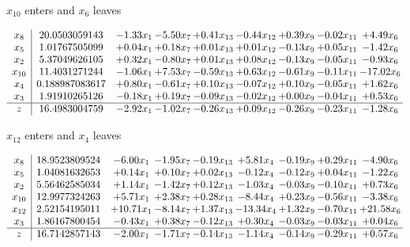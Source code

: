 \documentclass[9pt]{article}
\begin{document}
 $ x_{10} $ enters and $ x_{6} $ leaves 

 \[\begin{array}{c| c c@{\hskip 2pt} c@{\hskip 2pt} c@{\hskip 2pt} c@{\hskip 2pt} c@{\hskip 2pt} c@{\hskip 2pt} c@{\hskip 2pt} }
 x_{8}   &  20.0503059143 & -1.33 x_{1} & -5.50 x_{7} & +  0.41 x_{13} & -0.44 x_{12} & +  0.39 x_{9} & -0.02 x_{11} & +  4.49 x_{6}\\
 x_{5}   &  1.01767505099 & +  0.04 x_{1} & +  0.18 x_{7} & +  0.01 x_{13} & +  0.01 x_{12} & -0.13 x_{9} & +  0.05 x_{11} & -1.42 x_{6}\\
 x_{2}   &  5.37049626105 & +  0.32 x_{1} & -0.80 x_{7} & +  0.01 x_{13} & +  0.08 x_{12} & -0.13 x_{9} & -0.05 x_{11} & -0.93 x_{6}\\
 x_{10}   &  11.4031271244 & -1.06 x_{1} & +  7.53 x_{7} & -0.59 x_{13} & +  0.63 x_{12} & -0.61 x_{9} & -0.11 x_{11} & -17.02 x_{6}\\
 x_{4}   &  0.188987083617 & +  0.80 x_{1} & -0.61 x_{7} & +  0.10 x_{13} & -0.07 x_{12} & +  0.10 x_{9} & -0.05 x_{11} & +  1.62 x_{6}\\
 x_{3}   &  1.91910265126 & -0.18 x_{1} & +  0.19 x_{7} & -0.09 x_{13} & -0.02 x_{12} & +  0.00 x_{9} & -0.04 x_{11} & +  0.53 x_{6}\\
\hline
z    &  16.4983004759 & -2.92 x_{1} & -1.02 x_{7} & -0.26 x_{13} & +  0.09 x_{12} & -0.26 x_{9} & -0.23 x_{11} & -1.28 x_{6}\\
\end{array}\]


 $ x_{12} $ enters and $ x_{4} $ leaves 

 \[\begin{array}{c| c c@{\hskip 2pt} c@{\hskip 2pt} c@{\hskip 2pt} c@{\hskip 2pt} c@{\hskip 2pt} c@{\hskip 2pt} c@{\hskip 2pt} }
 x_{8}   &  18.9523809524 & -6.00 x_{1} & -1.95 x_{7} & -0.19 x_{13} & +  5.81 x_{4} & -0.19 x_{9} & +  0.29 x_{11} & -4.90 x_{6}\\
 x_{5}   &  1.04081632653 & +  0.14 x_{1} & +  0.10 x_{7} & +  0.02 x_{13} & -0.12 x_{4} & -0.12 x_{9} & +  0.04 x_{11} & -1.22 x_{6}\\
 x_{2}   &  5.56462585034 & +  1.14 x_{1} & -1.42 x_{7} & +  0.12 x_{13} & -1.03 x_{4} & -0.03 x_{9} & -0.10 x_{11} & +  0.73 x_{6}\\
 x_{10}   &  12.9977324263 & +  5.71 x_{1} & +  2.38 x_{7} & +  0.28 x_{13} & -8.44 x_{4} & +  0.23 x_{9} & -0.56 x_{11} & -3.38 x_{6}\\
 x_{12}   &  2.52154195011 & + 10.71 x_{1} & -8.14 x_{7} & +  1.37 x_{13} & -13.34 x_{4} & +  1.32 x_{9} & -0.70 x_{11} & + 21.58 x_{6}\\
 x_{3}   &  1.86167800454 & -0.43 x_{1} & +  0.38 x_{7} & -0.12 x_{13} & +  0.30 x_{4} & -0.03 x_{9} & -0.03 x_{11} & +  0.04 x_{6}\\
\hline
z    &  16.7142857143 & -2.00 x_{1} & -1.71 x_{7} & -0.14 x_{13} & -1.14 x_{4} & -0.14 x_{9} & -0.29 x_{11} & +  0.57 x_{6}\\
\end{array}\]
\end{document}

